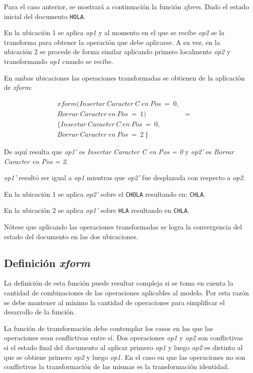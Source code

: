 \documentclass[12pt,a4paper]{article}
\begin{document}
	Para el caso anterior, se mostrará a continuación la función \textit{xform}.
	Dado el estado inicial del documento \texttt{HOLA}.

	En la ubicación 1 se aplica \textit{op1} y al momento en el que se recibe \textit{op2} se la transforma 
	para obtener la operación que debe aplicarse. A su vez, en la ubicación 2 se procede de forma similar
	aplicando primero localmente \textit{op2} y transformando \textit{op1} cuando se recibe.

	En ambas ubicaciones las operaciones transformadas se obtienen de la aplicación de \textit{xform}:
	
\begin{eqnarray*}
  xform(Insertar\ Caracter\ C\ en\ Pos\ =\ 0, \\
  Borrar\ Caracter\ en\ Pos\ =\ 1) & = & \\ 
  \lbrace Insertar\ Caracter\ C\ en\ Pos\ =\ 0, \\
  Borrar\ Caracter\ en\ Pos\ =\ 2\ \rbrace  
\end{eqnarray*}

	De aquí resulta que \textit{op1’} es \textit{Insertar Caracter C en Pos = 0} y \textit{op2’} es 
	\textit{Borrar Caracter en Pos = 2}.

\textit{op1’} resultó ser igual a \textit{op1} mientras que \textit{op2’} fue desplazada con respecto a 
\textit{op2.}

En la ubicación 1 se aplica \textit{op2’} sobre el \texttt{CHOLA} resultando en: \texttt{CHLA}.

En la ubicación 2 se aplica \textit{op1’} sobre \texttt{HLA} resultando en \texttt{CHLA}.

Nótese que aplicando las operaciones transformadas se logra la convergencia del estado del documento 
en las dos ubicaciones.

\subsection{Definición \textit{xform}}

La definición de esta función puede resultar compleja si se toma en cuenta la cantidad de 
combinaciones de las operaciones aplicables al modelo. Por esta razón se debe mantener al mínimo la 
cantidad de operaciones para simplificar el desarrollo de la función.

La función de transformación debe contemplar los casos en las que las operaciones sean conflictivas entre 
sí. Dos operaciones \textit{op1} y \textit{op2} son conflictivas si el estado final del documento al aplicar 
primero \textit{op1} y luego \textit{op2} es distinto al que se obtiene primero \textit{op2} y luego \textit{op1}.
En el caso en que las operaciones no son conflictivas la transformación de las mismas es la transformación 
identidad.
\end{document}
